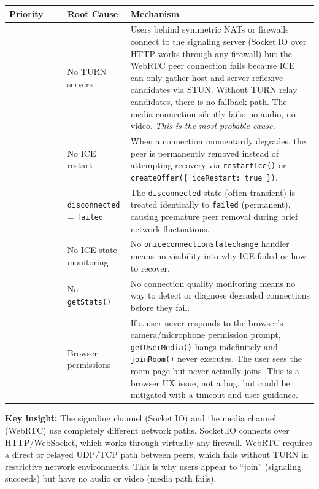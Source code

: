 \documentclass[11pt,letterpaper]{article}
\newcommand{\pricritical}{\colorbox{critical}{\textcolor{white}{\small\textbf{CRITICAL}}}}
\newcommand{\prihigh}{\colorbox{major}{\textcolor{white}{\small\textbf{HIGH}}}}
\newcommand{\primedium}{\colorbox{minor!80!black}{\textcolor{white}{\small\textbf{MEDIUM}}}}
\newcommand{\prilow}{\colorbox{notapplicable}{\textcolor{white}{\small\textbf{LOW}}}}
\begin{document}
\begin{center}
\begin{tabularx}{\textwidth}{C{1.2cm}L{3.5cm}L{8.5cm}}
\toprule
\textbf{Priority} & \textbf{Root Cause} & \textbf{Mechanism} \\
\midrule
{}
\pricritical & No TURN servers & Users behind symmetric NATs or firewalls connect to the signaling server (Socket.IO over HTTP works through any firewall) but the WebRTC peer connection fails because ICE can only gather host and server-reflexive candidates via STUN. Without TURN relay candidates, there is no fallback path. The media connection silently fails: no audio, no video. \textit{This is the most probable cause.} \\
\midrule
{}
\prihigh & No ICE restart & When a connection momentarily degrades, the peer is permanently removed instead of attempting recovery via \texttt{restartIce()} or \texttt{createOffer(\{ iceRestart: true \})}. \\
\midrule
{}
\prihigh & \texttt{disconnected} = \texttt{failed} & The \texttt{disconnected} state (often transient) is treated identically to \texttt{failed} (permanent), causing premature peer removal during brief network fluctuations. \\
\midrule
{}
\primedium & No ICE state monitoring & No \texttt{oniceconnectionstatechange} handler means no visibility into why ICE failed or how to recover. \\
\midrule
{}
\primedium & No \texttt{getStats()} & No connection quality monitoring means no way to detect or diagnose degraded connections before they fail. \\
\midrule
{}
\prilow & Browser permissions & If a user never responds to the browser's camera/microphone permission prompt, \texttt{getUserMedia()} hangs indefinitely and \texttt{joinRoom()} never executes. The user sees the room page but never actually joins. This is a browser UX issue, not a bug, but could be mitigated with a timeout and user guidance. \\
\bottomrule
\end{tabularx}
\end{center}

\textbf{Key insight:} The signaling channel (Socket.IO) and the media channel (WebRTC) use completely different network paths. Socket.IO connects over HTTP/WebSocket, which works through virtually any firewall. WebRTC requires a direct or relayed UDP/TCP path between peers, which fails without TURN in restrictive network environments. This is why users appear to ``join'' (signaling succeeds) but have no audio or video (media path fails).
\end{document}

